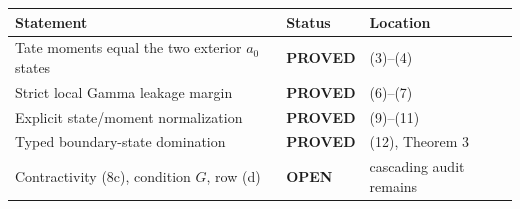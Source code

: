 \documentclass[11pt]{article}
\newcommand{\PROVED}{\textcolor{green!40!black}{\textbf{PROVED}}}
\newcommand{\OPEN}{\textcolor{red!70!black}{\textbf{OPEN}}}
\begin{document}
\begin{center}
\begin{tabular}{>{\raggedright\arraybackslash}p{.55\linewidth}
                >{\centering\arraybackslash}p{.15\linewidth}
                >{\raggedright\arraybackslash}p{.20\linewidth}}
\toprule
Statement & Status & Location \\
\midrule
Tate moments equal the two exterior $a_0$ states & \PROVED & (3)--(4) \\
Strict local Gamma leakage margin & \PROVED & (6)--(7) \\
Explicit state/moment normalization & \PROVED & (9)--(11) \\
Typed boundary-state domination & \PROVED & (12), Theorem 3 \\
Contractivity (8c), condition $G$, row (d) & \OPEN & cascading audit remains \\
\bottomrule
\end{tabular}
\end{center}
\end{document}
